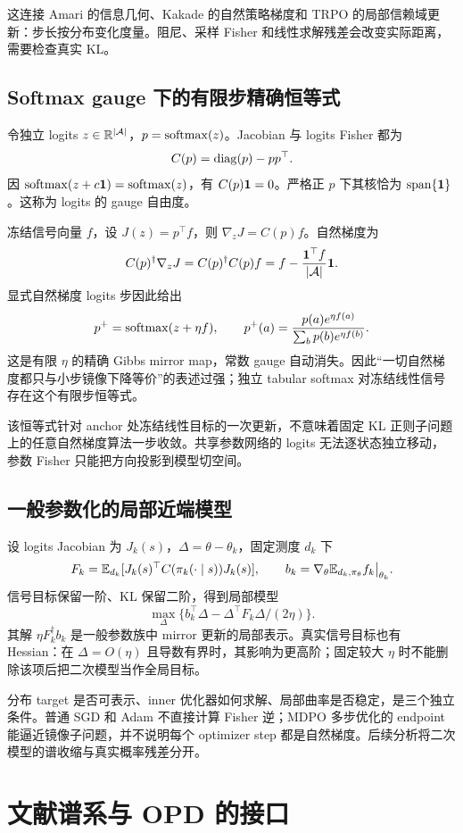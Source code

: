这连接 Amari 的信息几何、Kakade 的自然策略梯度和 TRPO 的局部信赖域更新：步长按分布变化度量。阻尼、采样 Fisher 和线性求解残差会改变实际距离，需要检查真实 KL。\cite{amari1998,kakade01,trpo15}

\subsection{Softmax gauge 下的有限步精确恒等式}

令独立 logits $z\in\mathbb{R}^{|\mathcal A|}$，$p=\operatorname{softmax}(z)$。Jacobian 与 logits Fisher 都为
\[
 C(p)=\operatorname{diag}(p)-pp^\top.
\]
因 $\operatorname{softmax}(z+c\mathbf{1})=\operatorname{softmax}(z)$，有 $C(p)\mathbf{1}=0$。严格正 $p$ 下其核恰为 $\operatorname{span}\{\mathbf{1}\}$。这称为 logits 的 gauge 自由度。

冻结信号向量 $f$，设 $J(z)=p^\top f$，则 $\nabla_zJ=C(p)f$。自然梯度为
\[
 C(p)^\dagger\nabla_zJ=C(p)^\dagger C(p)f
 =f-\frac{\mathbf{1}^\top f}{|\mathcal A|}\mathbf{1}.
\]
显式自然梯度 logits 步因此给出
\[
 p^+=\operatorname{softmax}(z+\eta f),\qquad
 p^+(a)=\frac{p(a)e^{\eta f(a)}}{\sum_bp(b)e^{\eta f(b)}}.
\]
这是有限 $\eta$ 的精确 Gibbs mirror map，常数 gauge 自动消失。因此“一切自然梯度都只与小步镜像下降等价”的表述过强；独立 tabular softmax 对冻结线性信号存在这个有限步恒等式。

该恒等式针对 anchor 处冻结线性目标的一次更新，不意味着固定 KL 正则子问题上的任意自然梯度算法一步收敛。共享参数网络的 logits 无法逐状态独立移动，参数 Fisher 只能把方向投影到模型切空间。

\subsection{一般参数化的局部近端模型}

设 logits Jacobian 为 $J_k(s)$，$\Delta=\theta-\theta_k$，固定测度 $d_k$ 下
\[
 F_k=\mathbb{E}_{d_k}[J_k(s)^\top C(\pi_k(\cdot\mid s))J_k(s)],\qquad
 b_k=\nabla_\theta\mathbb{E}_{d_k,\pi_\theta}f_k\big|_{\theta_k}.
\]
信号目标保留一阶、KL 保留二阶，得到局部模型
\[
 \max_\Delta\{b_k^\top\Delta-\Delta^\top F_k\Delta/(2\eta)\}.
\]
其解 $\eta F_k^\dagger b_k$ 是一般参数族中 mirror 更新的局部表示。真实信号目标也有 Hessian：在 $\Delta=O(\eta)$ 且导数有界时，其影响为更高阶；固定较大 $\eta$ 时不能删除该项后把二次模型当作全局目标。

分布 target 是否可表示、inner 优化器如何求解、局部曲率是否稳定，是三个独立条件。普通 SGD 和 Adam 不直接计算 Fisher 逆；MDPO 多步优化的 endpoint 能逼近镜像子问题，并不说明每个 optimizer step 都是自然梯度。后续分析将二次模型的谱收缩与真实概率残差分开。

\section{文献谱系与 OPD 的接口}

